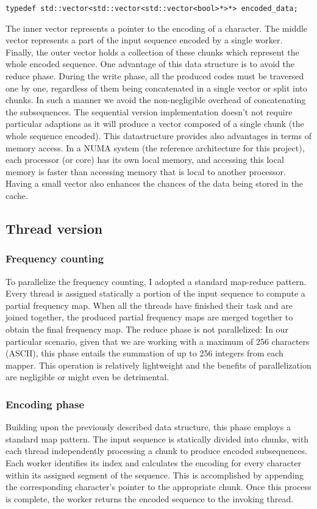 \documentclass{article}
\begin{document}
\begin{verbatim}
typedef std::vector<std::vector<std::vector<bool>*>*> encoded_data;
\end{verbatim}

The inner vector represents a
pointer to the encoding of a character. The middle vector
represents a part of the input sequence encoded by a single worker.
Finally, the outer vector holds a collection of these chunks which represent
the whole encoded sequence.
One advantage of this data structure is to avoid the reduce phase.
During the write phase, all the produced codes must be traversed one by one, regardless
of them being concatenated in a single vector or split into chunks. In such a manner we
avoid the non-negligible overhead of concatenating the subsequences.
The sequential version implementation doesn't not require particular adaptions as it
will produce a vector composed of a single chunk (the whole sequence encoded).
This datastructure provides also advantages in terms of memory access.
In a NUMA system (the reference architecture for this project), each processor (or core) has its own local memory,
and accessing this local memory is faster than accessing memory that is local to another processor.
Having a small vector also enhances the chances of the data being stored in the cache.

\subsection{Thread version}
\subsubsection{Frequency counting}
To parallelize the frequency counting, I adopted a standard
map-reduce pattern. Every thread is assigned statically a portion of
the input sequence to compute a partial frequency map.
When all the threads have finished their task and are joined together,
the produced partial frequency maps are merged together to obtain the final
frequency map. The reduce phase is not parallelized:
In our particular scenario, given that we are working with a maximum of 256 characters (ASCII),
this phase entails the summation of up to 256 integers from each mapper.
This operation is relatively lightweight and the benefits of parallelization are negligible
or might even be detrimental.
\subsubsection{Encoding phase}
Building upon the previously described data structure, this phase employs a standard map pattern.
The input sequence is statically divided into chunks, with each thread independently processing a
chunk to produce encoded subsequences.
Each worker identifies its index and calculates the encoding for every character within
its assigned segment of the sequence. This is accomplished by appending the corresponding
character's pointer to the appropriate chunk. Once this process is complete, the worker returns
the encoded sequence to the invoking thread.
\end{document}
